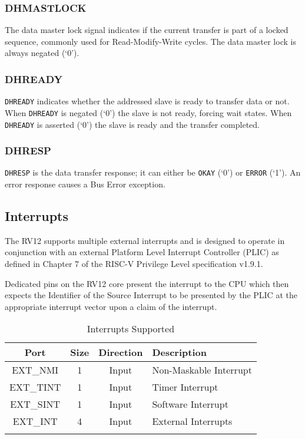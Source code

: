 \subsubsection{DHMASTLOCK}\label{dhmastlock}

The data master lock signal indicates if the current transfer is part of
a locked sequence, commonly used for Read-Modify-Write cycles. The data
master lock is always negated (`0').

\subsubsection{DHREADY}\label{dhready}

\texttt{DHREADY} indicates whether the addressed slave is ready to transfer data
or not. When \texttt{DHREADY} is negated (`0') the slave is not ready, forcing
wait states. When \texttt{DHREADY} is asserted (`0') the slave is ready and the
transfer completed.

\subsubsection{DHRESP}\label{dhresp}

\texttt{DHRESP} is the data transfer response; it can either be \texttt{OKAY} (`0') or
\texttt{ERROR} (`1'). An error response causes a Bus Error exception.

\subsection{Interrupts}\label{interrupts}

The RV12 supports multiple external interrupts and is designed to
operate in conjunction with an external Platform Level Interrupt
Controller (PLIC) as defined in Chapter 7 of the RISC-V Privilege Level
specification v1.9.1.

Dedicated pins on the RV12 core present the interrupt to the CPU which
then expects the Identifier of the Source Interrupt to be presented by
the PLIC at the appropriate interrupt vector upon a claim of the
interrupt.

\begin{longtable}[]{@{}cccl@{}}
\toprule
Port & Size & Direction & Description\tabularnewline
\midrule
\endhead
EXT\_NMI & 1 & Input & Non-Maskable Interrupt\tabularnewline
EXT\_TINT & 1 & Input & Timer Interrupt\tabularnewline
EXT\_SINT & 1 & Input & Software Interrupt\tabularnewline
EXT\_INT & 4 & Input & External Interrupts\tabularnewline
\bottomrule
\caption{Interrupts Supported}
\label{tab:int-support}
\end{longtable}

